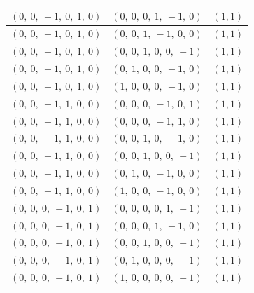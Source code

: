 \documentclass[11pt]{article}
\theoremstyle{definition}
\begin{document}
\begin{center}
\begin{tabular}{|l|l|c|}
    \hline
    $\left( 0, \  0, \  -1, \  0, \  1, \  0\right)$ & $\left( 0, \  0, \  0, \  1, \  -1, \  0\right)$ & $(1,1)$ \\
    \hline
    $\left( 0, \  0, \  -1, \  0, \  1, \  0\right)$ & $\left( 0, \  0, \  1, \  -1, \  0, \  0\right)$ & $(1,1)$ \\
    \hline
    $\left( 0, \  0, \  -1, \  0, \  1, \  0\right)$ & $\left( 0, \  0, \  1, \  0, \  0, \  -1\right)$ & $(1,1)$ \\
    \hline
    $\left( 0, \  0, \  -1, \  0, \  1, \  0\right)$ & $\left( 0, \  1, \  0, \  0, \  -1, \  0\right)$ & $(1,1)$ \\
    \hline
    $\left( 0, \  0, \  -1, \  0, \  1, \  0\right)$ & $\left( 1, \  0, \  0, \  0, \  -1, \  0\right)$ & $(1,1)$ \\
    \hline
    $\left( 0, \  0, \  -1, \  1, \  0, \  0\right)$ & $\left( 0, \  0, \  0, \  -1, \  0, \  1\right)$ & $(1,1)$ \\
    \hline
    $\left( 0, \  0, \  -1, \  1, \  0, \  0\right)$ & $\left( 0, \  0, \  0, \  -1, \  1, \  0\right)$ & $(1,1)$ \\
    \hline
    $\left( 0, \  0, \  -1, \  1, \  0, \  0\right)$ & $\left( 0, \  0, \  1, \  0, \  -1, \  0\right)$ & $(1,1)$ \\
    \hline
    $\left( 0, \  0, \  -1, \  1, \  0, \  0\right)$ & $\left( 0, \  0, \  1, \  0, \  0, \  -1\right)$ & $(1,1)$ \\
    \hline
    $\left( 0, \  0, \  -1, \  1, \  0, \  0\right)$ & $\left( 0, \  1, \  0, \  -1, \  0, \  0\right)$ & $(1,1)$ \\
    \hline
    $\left( 0, \  0, \  -1, \  1, \  0, \  0\right)$ & $\left( 1, \  0, \  0, \  -1, \  0, \  0\right)$ & $(1,1)$ \\
    \hline
    $\left( 0, \  0, \  0, \  -1, \  0, \  1\right)$ & $\left( 0, \  0, \  0, \  0, \  1, \  -1\right)$ & $(1,1)$ \\
    \hline
    $\left( 0, \  0, \  0, \  -1, \  0, \  1\right)$ & $\left( 0, \  0, \  0, \  1, \  -1, \  0\right)$ & $(1,1)$ \\
    \hline
    $\left( 0, \  0, \  0, \  -1, \  0, \  1\right)$ & $\left( 0, \  0, \  1, \  0, \  0, \  -1\right)$ & $(1,1)$ \\
    \hline
    $\left( 0, \  0, \  0, \  -1, \  0, \  1\right)$ & $\left( 0, \  1, \  0, \  0, \  0, \  -1\right)$ & $(1,1)$ \\
    \hline
    $\left( 0, \  0, \  0, \  -1, \  0, \  1\right)$ & $\left( 1, \  0, \  0, \  0, \  0, \  -1\right)$ & $(1,1)$ \\

\end{tabular}
\end{center}
\end{document}
